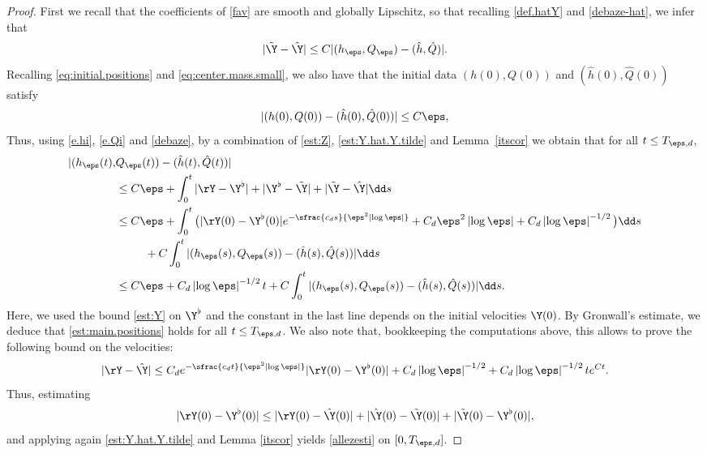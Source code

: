 \begin{proof}
First we recall that the coefficients of \eqref{fav} are smooth and globally Lipschitz, so that recalling \eqref{def.hatY} and \eqref{debaze-hat}, we infer that
\begin{equation} \label{est:Y.hat.Y.tilde}
|\tilde \Y - \hat \Y| \leq C |(h_\eps,Q_\eps) - (\hat h, \hat Q)|.
\end{equation}
Recalling \eqref{eq:initial.positions} and \eqref{eq:center.mass.small}, we also have that
the initial data $(h(0),Q(0))$ and $(\hat h(0),\hat Q(0))$ satisfy
\begin{equation}
|(h(0),Q(0)) - (\hat h(0),\hat Q(0))| \leq C \eps,
\end{equation}
Thus, using \eqref{e.hi}, \eqref{e.Qi} and
\eqref{debaze}, by a combination of \eqref{est:Z}, \eqref{est:Y.hat.Y.tilde} and Lemma~\ref{itscor}
we obtain that for all $t \leq T_{\eps,d}$,%
\begin{align*}
| (h_\eps(t),&Q_\eps(t)) - (\hat h(t),\hat Q(t)) |\\
&\leq C \eps + \int_0^t |\rY - {\Y^\flat}| + |{\Y^\flat} - \tilde \Y| + |\tilde \Y - \hat \Y| \dd s\\
& \leq C \eps + \int_0^t \big(|\rY(0) - {\Y^\flat}(0)| e^{- \sfrac{c_d s}{\eps^2 \left|\log \eps\right|}} + C_d \eps^2 \left|\log \eps\right| + C_d \left|\log \eps\right|^{-1/2} \big) \dd s\\
& \hspace*{.9cm}+ C \int_0^t |(h_\eps(s),Q_\eps(s)) - (\hat h(s), \hat Q(s))| \dd s \\
& \leq C \eps
+ C_d \left|\log \eps\right|^{-1/2} t + C \int_0^t |(h_\eps(s),Q_\eps(s)) - (\hat h(s), \hat Q(s))| \dd s.
\end{align*}
Here, we used the bound \eqref{est:Y} on ${\Y^\flat}$ and the constant in the last line depends on the initial velocities $\Y(0)$.
By Gronwall's estimate, we deduce that \eqref{est:main.positions} holds for all $t \leq T_{\eps,d}$.
We also note that, bookkeeping the computations above, this allows to prove the following bound on the velocities:
\begin{equation} \label{est:main.velocities}
|\rY - \hat \Y| \leq C_d e^{- \sfrac{c_dt}{\eps^2 \left|\log\eps\right|}}{|\rY(0) - {\Y^\flat}(0)|} + C_d \left|\log \eps\right|^{-1/2} + C_d \left|\log \eps\right|^{-1/2} t e^{Ct}.
\end{equation}
{Thus, estimating
\begin{equation}
|\rY(0) - {\Y^\flat}(0)| \leq |\rY(0) - \hat \Y(0)| + |\hat \Y(0) - \tilde \Y(0)| + |\tilde \Y(0) - {\Y^\flat}(0)|,
\end{equation}
and applying again \eqref{est:Y.hat.Y.tilde} and Lemma \ref{itscor} yields \eqref{allezesti} on $[0,T_{\eps,d}]$.}
\end{proof}

